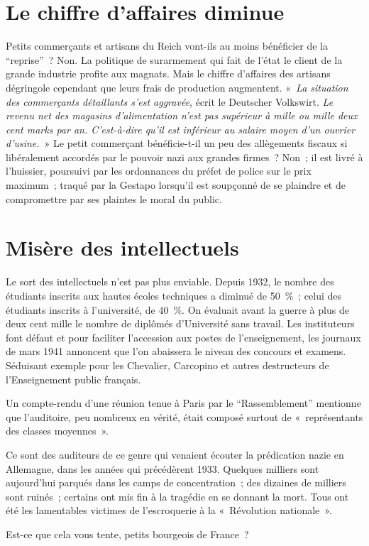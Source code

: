 \documentclass[french,twoside]{book} %
\newcommand\chapterclose{} %
\begin{document}
\section[Le chiffre d’affaires diminue]{Le chiffre d’affaires diminue}
\noindent Petits commerçants et artisans du Reich vont-ils au moins bénéficier de la “reprise” ? Non. La politique de surarmement qui fait de l’état le client de la grande industrie profite aux magnats. Mais le chiffre d’affaires des artisans dégringole cependant que leurs frais de production augmentent. « \emph{La situation des commerçants détaillants s’est aggravée}, écrit le Deutscher Volkswirt. \emph{Le revenu net des magasins d’alimentation n’est pas supérieur à mille ou mille deux cent marks par an. C’est-à-dire qu’il est inférieur au salaire moyen d’un ouvrier d’usine.} » Le petit commerçant bénéficie-t-il un peu des allègements fiscaux si libéralement accordés par le pouvoir nazi aux grandes firmes ? Non ; il est livré à l’huissier, poursuivi par les ordonnances du préfet de police sur le prix maximum ; traqué par la Gestapo lorsqu’il est soupçonné de se plaindre et de compromettre par ses plaintes le moral du public.
\section[Misère des intellectuels]{Misère des intellectuels}
\noindent Le sort des intellectuels n’est pas plus enviable. Depuis 1932, le nombre des étudiants inscrits aux hautes écoles techniques a diminué de 50 \% ; celui des étudiants inscrits à l’université, de 40 \%. On évaluait avant la guerre à plus de deux cent mille le nombre de diplômés d’Université sans travail. Les instituteurs font défaut et pour faciliter l’accession aux postes de l’enseignement, les journaux de mars 1941 annoncent que l’on abaissera le niveau des concours et examens. Séduisant exemple pour les Chevalier, Carcopino et autres destructeurs de l’Enseignement public français.\par
Un compte-rendu d’une réunion tenue à Paris par le “Rassemblement” mentionne que l’auditoire, peu nombreux en vérité, était composé surtout de « représentants des classes moyennes ».\par
Ce sont des auditeurs de ce genre qui venaient écouter la prédication nazie en Allemagne, dans les années qui précédèrent 1933. Quelques milliers sont aujourd’hui parqués dans les camps de concentration ; des dizaines de milliers sont ruinés ; certains ont mis fin à la tragédie en se donnant la mort. Tous ont été les lamentables victimes de l’escroquerie à la « Révolution nationale ».\par
Est-ce que cela vous tente, petits bourgeois de France ?
\chapterclose
\end{document}
